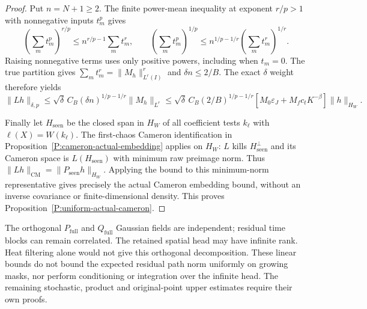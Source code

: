 \begin{proof}
  Put $n=N+1\ge2$. The finite power-mean inequality at exponent
  $r/p>1$ with nonnegative inputs $t_m^p$ gives
  \[
    \left(\sum_m t_m^p\right)^{r/p}
    \le n^{r/p-1}\sum_m t_m^r,\qquad
    \left(\sum_m t_m^p\right)^{1/p}
    \le n^{1/p-1/r}\left(\sum_m t_m^r\right)^{1/r}.
  \]
  Raising nonnegative terms uses only positive powers, including
  when $t_m=0$. The true partition gives
  $\sum_m t_m^r=\|M_h\|_{L^r(I)}^r$ and $\delta n\le2/B$.
  The exact $\delta$ weight therefore yields
  \[
    \|Lh\|_{\delta,p}
    \le\sqrt\delta\,C_B(\delta n)^{1/p-1/r}\|M_h\|_{L^r}
    \le\sqrt\delta\,C_B(2/B)^{1/p-1/r}
    [M_0\varepsilon_J+M_fc_tK^{-\beta}]\|h\|_{H_W}.
  \]

  Finally let $H_{\mathrm{seen}}$ be the closed span in $H_W$
  of all coefficient tests $k_\ell$ with $\ell(X)=W(k_\ell)$.
  The first-chaos Cameron identification in
  Proposition~\ref{P:cameron-actual-embedding} applies on $H_W$:
  $L$ kills $H_{\mathrm{seen}}^\perp$ and its Cameron space is
  $L(H_{\mathrm{seen}})$ with minimum raw preimage norm.
  Thus $\|Lh\|_{\mathrm{CM}}=\|P_{\mathrm{seen}}h\|_{H_W}$.
  Applying the bound to this minimum-norm representative gives
  precisely the actual Cameron embedding bound, without an
  inverse covariance or finite-dimensional density.
  This proves Proposition~\ref{P:uniform-actual-cameron}.
\end{proof}

The orthogonal $P_{\mathrm{full}}$ and $Q_{\mathrm{full}}$ Gaussian
fields are independent; residual time blocks can remain correlated.
The retained spatial head may have infinite rank.
Heat filtering alone would not give this orthogonal decomposition.
These linear bounds do not bound the expected residual path norm
uniformly on growing masks, nor perform conditioning or integration
over the infinite head. The remaining stochastic, product and
original-point upper estimates require their own proofs.
